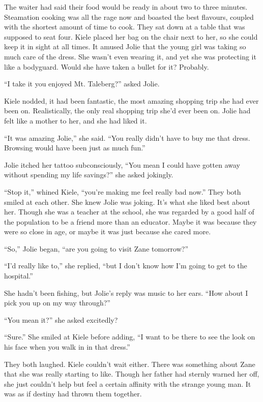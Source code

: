 The waiter had said their food would be ready in about two to three minutes.  Steamation cooking was all the rage now and boasted the best flavours, coupled with the shortest amount of time to cook.  They sat down at a table that was supposed to seat four.  Kiele placed her bag on the chair next to her, so she could keep it in sight at all times.  It amused Jolie that the young girl was taking so much care of the dress.  She wasn't even wearing it, and yet she was protecting it like a bodyguard.  Would she have taken a bullet for it?  Probably.

``I take it you enjoyed Mt. Taleberg?'' asked Jolie.  

Kiele nodded, it had been fantastic, the most amazing shopping trip she had ever been on.  Realistically, the only real shopping trip she'd ever been on.  Jolie had felt like a mother to her, and she had liked it.  

``It was amazing Jolie,'' she said.  ``You really didn't have to buy me that dress.  Browsing would have been just as much fun.''  

Jolie itched her tattoo subconsciously, ``You mean I could have gotten away without spending my life savings?'' she asked jokingly.  

``Stop it,'' whined Kiele, ``you're making me feel really bad now.''   They both smiled at each other.  She knew Jolie was joking.  It's what she liked best about her.  Though she was a teacher at the school, she was regarded by a good half of the population to be a friend more than an educator.  Maybe it was because they were so close in age, or maybe it was just because she cared more.

``So,'' Jolie began, ``are you going to visit Zane tomorrow?''

``I'd really like to,'' she replied, ``but I don't know how I'm going to get to the hospital.''

She hadn't been fishing, but Jolie's reply was music to her ears.  ``How about I pick you up on my way through?''

``You mean it?'' she asked excitedly?

``Sure.''  She smiled at Kiele before adding, ``I want to be there to see the look on his face when you walk in in that dress.''

They both laughed.  Kiele couldn't wait either.  There was something about Zane that she was really starting to like.  Though her father had sternly warned her off, she just couldn't help but feel a certain affinity with the strange young man.  It was as if destiny had thrown them together.  

